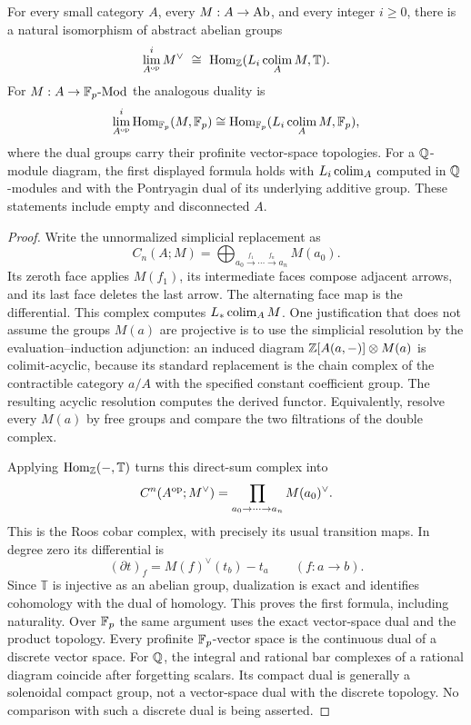 \begin{theorem}\label{C:duality}
For every small category $A$, every $M:A\to\mathrm{Ab}$, and every integer $i\geq0$, there is a natural isomorphism of abstract abelian groups
\[
 \lim_{A^{\op}}^{i}M^\vee\ \cong\ \Hom_{\Z}(L_i\colim_A M,\mathbb T).
\]
For $M:A\to\mathbb F_p\text{-}\mathrm{Mod}$ the analogous duality is
\[
 \lim_{A^{\mathrm{op}}}^{i}\operatorname{Hom}_{\mathbb F_p}(M,\mathbb F_p)
 \cong\operatorname{Hom}_{\mathbb F_p}(L_i\operatorname*{colim}_A M,\mathbb F_p),
\]
where the dual groups carry their profinite vector-space topologies. For a $\mathbb Q$-module diagram, the first displayed formula holds with $L_i\operatorname*{colim}_A$ computed in $\mathbb Q$-modules and with the Pontryagin dual of its underlying additive group. These statements include empty and disconnected $A$.
\end{theorem}
\begin{proof}
Write the unnormalized simplicial replacement as
\[
 C_n(A;M)=\bigoplus_{a_0\xrightarrow{f_1}\cdots\xrightarrow{f_n}a_n}M(a_0).
\]
Its zeroth face applies $M(f_1)$, its intermediate faces compose adjacent arrows, and its last face deletes the last arrow. The alternating face map is the differential. This complex computes $L_*\operatorname*{colim}_A M$. One justification that does not assume the groups $M(a)$ are projective is to use the simplicial resolution by the evaluation--induction adjunction: an induced diagram $\mathbb Z[A(a,-)]\otimes M(a)$ is colimit-acyclic, because its standard replacement is the chain complex of the contractible category $a/A$ with the specified constant coefficient group. The resulting acyclic resolution computes the derived functor. Equivalently, resolve every $M(a)$ by free groups and compare the two filtrations of the double complex.

Applying $\operatorname{Hom}_{\mathbb Z}(-,\mathbb T)$ turns this direct-sum complex into
\[
 C^n(A^{\mathrm{op}};M^\vee)=\prod_{a_0\to\cdots\to a_n}M(a_0)^\vee.
\]
This is the Roos cobar complex, with precisely its usual transition maps. In degree zero its differential is
\[
 (\partial t)_f=M(f)^\vee(t_b)-t_a\qquad(f:a\to b).
\]
Since $\mathbb T$ is injective as an abelian group, dualization is exact and identifies cohomology with the dual of homology. This proves the first formula, including naturality. Over $\mathbb F_p$ the same argument uses the exact vector-space dual and the product topology. Every profinite $\mathbb F_p$-vector space is the continuous dual of a discrete vector space. For $\mathbb Q$, the integral and rational bar complexes of a rational diagram coincide after forgetting scalars. Its compact dual is generally a solenoidal compact group, not a vector-space dual with the discrete topology. No comparison with such a discrete dual is being asserted.
\end{proof}

